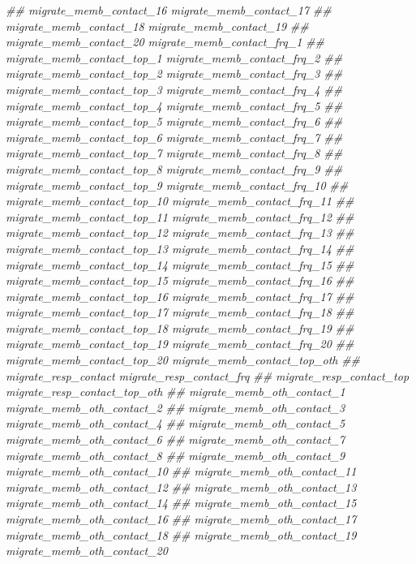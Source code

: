 \documentclass[
]{article}
\newenvironment{Shaded}{\begin{snugshade}}{\end{snugshade}}
\newcommand{\CommentTok}[1]{\textcolor[rgb]{0.56,0.35,0.01}{\textit{#1}}}
\begin{document}
\begin{Shaded}
\begin{Highlighting}[]
\CommentTok{##      migrate_memb_contact_16 migrate_memb_contact_17}
\CommentTok{##      migrate_memb_contact_18 migrate_memb_contact_19}
\CommentTok{##      migrate_memb_contact_20 migrate_memb_contact_frq_1}
\CommentTok{##      migrate_memb_contact_top_1 migrate_memb_contact_frq_2}
\CommentTok{##      migrate_memb_contact_top_2 migrate_memb_contact_frq_3}
\CommentTok{##      migrate_memb_contact_top_3 migrate_memb_contact_frq_4}
\CommentTok{##      migrate_memb_contact_top_4 migrate_memb_contact_frq_5}
\CommentTok{##      migrate_memb_contact_top_5 migrate_memb_contact_frq_6}
\CommentTok{##      migrate_memb_contact_top_6 migrate_memb_contact_frq_7}
\CommentTok{##      migrate_memb_contact_top_7 migrate_memb_contact_frq_8}
\CommentTok{##      migrate_memb_contact_top_8 migrate_memb_contact_frq_9}
\CommentTok{##      migrate_memb_contact_top_9 migrate_memb_contact_frq_10}
\CommentTok{##      migrate_memb_contact_top_10 migrate_memb_contact_frq_11}
\CommentTok{##      migrate_memb_contact_top_11 migrate_memb_contact_frq_12}
\CommentTok{##      migrate_memb_contact_top_12 migrate_memb_contact_frq_13}
\CommentTok{##      migrate_memb_contact_top_13 migrate_memb_contact_frq_14}
\CommentTok{##      migrate_memb_contact_top_14 migrate_memb_contact_frq_15}
\CommentTok{##      migrate_memb_contact_top_15 migrate_memb_contact_frq_16}
\CommentTok{##      migrate_memb_contact_top_16 migrate_memb_contact_frq_17}
\CommentTok{##      migrate_memb_contact_top_17 migrate_memb_contact_frq_18}
\CommentTok{##      migrate_memb_contact_top_18 migrate_memb_contact_frq_19}
\CommentTok{##      migrate_memb_contact_top_19 migrate_memb_contact_frq_20}
\CommentTok{##      migrate_memb_contact_top_20 migrate_memb_contact_top_oth}
\CommentTok{##      migrate_resp_contact migrate_resp_contact_frq}
\CommentTok{##      migrate_resp_contact_top migrate_resp_contact_top_oth}
\CommentTok{##      migrate_memb_oth_contact_1 migrate_memb_oth_contact_2}
\CommentTok{##      migrate_memb_oth_contact_3 migrate_memb_oth_contact_4}
\CommentTok{##      migrate_memb_oth_contact_5 migrate_memb_oth_contact_6}
\CommentTok{##      migrate_memb_oth_contact_7 migrate_memb_oth_contact_8}
\CommentTok{##      migrate_memb_oth_contact_9 migrate_memb_oth_contact_10}
\CommentTok{##      migrate_memb_oth_contact_11 migrate_memb_oth_contact_12}
\CommentTok{##      migrate_memb_oth_contact_13 migrate_memb_oth_contact_14}
\CommentTok{##      migrate_memb_oth_contact_15 migrate_memb_oth_contact_16}
\CommentTok{##      migrate_memb_oth_contact_17 migrate_memb_oth_contact_18}
\CommentTok{##      migrate_memb_oth_contact_19 migrate_memb_oth_contact_20}

\end{Highlighting}
\end{Shaded}
\end{document}
